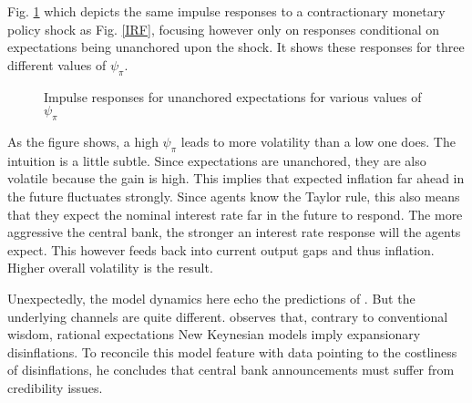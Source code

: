 \documentclass[11pt]{article}
\def \myFigPath {../../figures/}
\renewcommand{\[}{\begin{equation}}
\renewcommand{\]}{\end{equation}}
\begin{document}
Fig. \ref{IRF_unanchored_psi} which depicts the same impulse responses to a contractionary monetary policy shock as Fig. \ref{IRF}, focusing however only on responses conditional on expectations being unanchored upon the shock. It shows these responses for three different values of $\psi_{\pi}$.

\begin{figure}[h!]
\caption{Impulse responses for unanchored expectations for various values of $\psi_{\pi}$}
\label{IRF_unanchored_psi}
\end{figure}

As the figure shows, a high $\psi_{\pi}$ leads to more volatility than a low one does. The intuition is a little subtle. Since expectations are unanchored, they are also volatile because the gain is high. This implies that expected inflation far ahead in the future fluctuates strongly. Since agents know the Taylor rule, this also means that they expect the nominal interest rate far in the future to respond. The more aggressive the central bank, the stronger an interest rate response will the agents expect. This however feeds back into current output gaps and thus inflation. Higher overall volatility is the result.

Unexpectedly, the model dynamics here echo the predictions of \cite{ball1994credible}. But the underlying channels are quite different. \cite{ball1994credible} observes that, contrary to conventional wisdom, rational expectations New Keynesian models imply expansionary disinflations. To reconcile this model feature with data pointing to the costliness of disinflations, he concludes that central bank announcements must suffer from credibility issues. 
\end{document}
